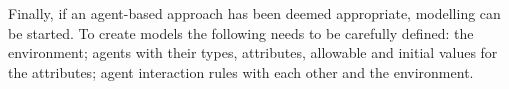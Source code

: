 Finally, if an agent-based approach has been deemed appropriate, modelling can
be started. To create models the following needs to be carefully defined: the
environment; agents with their types, attributes, allowable and initial values
for the attributes; agent interaction rules with each other and the
environment. \parencite{Bernhardt2007taxi+agent}
